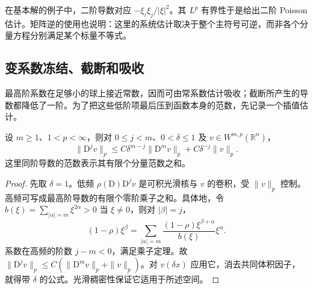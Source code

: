 在基本解的例子中，二阶导数对应 \(-\xi_i\xi_j/|\xi|^2\)。其 \(L^p\) 有界性于是给出二阶 Poisson 估计。矩阵逆的使用也说明：这里的系统估计取决于整个主符号可逆，而非各个分量方程分别满足某个标量不等式。

\subsection{变系数冻结、截断和吸收}
\label{g3:subsec:1204:04}
最高阶系数在足够小的球上接近常数，因而可由常系数估计吸收；截断所产生的导数都降低了一阶。为了把这些低阶项最后压到函数本身的范数，先记录一个插值估计。

\begin{lemma}\label{g3:lem:lp-derivative-interpolation}
	设 \(m\ge1\)、\(1<p<\infty\)，则对 \(0\le j<m\)、\(0<\delta\le1\) 及 \(v\in W^{m,p}(\mathbb R^n)\)，
	\[
		\|\mathrm D^jv\|_p\le C\delta^{m-j}\|\mathrm D^mv\|_p+C\delta^{-j}\|v\|_p.
	\]
	这里同阶导数的范数表示其有限个分量范数之和。
\end{lemma}
\begin{proof}
	先取 \(\delta=1\)。低频 \(\rho(\mathrm D)\mathrm D^jv\) 是可积光滑核与 \(v\) 的卷积，受 \(\|v\|_p\) 控制。高频可写成最高阶导数的有限个零阶乘子之和。具体地，令 \(b(\xi)=\sum_{|\alpha|=m}\xi^{2\alpha}>0\) 当 \(\xi\ne0\)，则对 \(|\beta|=j\)，
	\[
		(1-\rho)\xi^\beta
		=\sum_{|\alpha|=m}\frac{(1-\rho)\xi^{\beta+\alpha}}{b(\xi)}\xi^\alpha.
	\]
	系数在高频的阶数 \(j-m<0\)，满足乘子定理。故 \(\|\mathrm D^jv\|_p\le C(\|\mathrm D^mv\|_p+\|v\|_p)\)。对 \(v(\delta x)\) 应用它，消去共同体积因子，就得带 \(\delta\) 的公式。光滑稠密性保证它适用于所述空间。
\end{proof}

